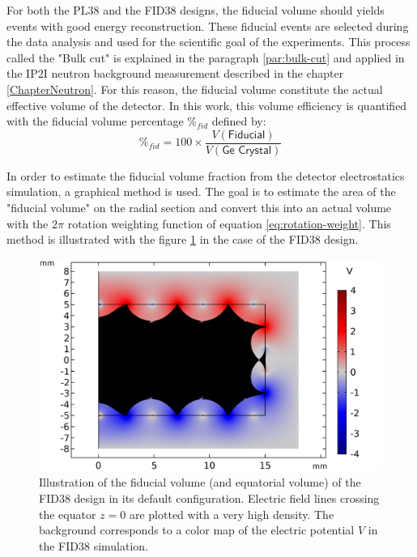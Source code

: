 For both the PL38 and the FID38 designs, the fiducial volume should yields events with good energy reconstruction. These fiducial events are selected during the data analysis and used for the scientific goal of the experiments. This process called the "Bulk cut" is explained in the paragraph \ref{par:bulk-cut} and applied in the IP2I neutron background measurement described in the chapter \ref{ChapterNeutron}. For this reason, the fiducial volume constitute the actual effective volume of the detector. In this work, this volume efficiency is quantified with the fiducial volume percentage $\%_{fid}$ defined by:
\begin{equation}
\%_{fid} = 100 \times \frac{V(\textsf{Fiducial})}{V(\textsf{Ge Crystal})}
\end{equation} 
 
In order to estimate the fiducial volume fraction from the detector electrostatics simulation, a graphical method is used. The goal is to estimate the area of the "fiducial volume" on the radial section and convert this into an actual volume with the $2\pi$ rotation weighting function of equation \ref{eq:rotation-weight}. This method is illustrated with the figure \ref{fig:fid38-fiducial} in the case of the FID38 design. 

\begin{figure}
\centering
\includegraphics[scale=0.5]{Figures/Electrodes/fid38_fiducial_streamlines.png}
\caption{Illustration of the fiducial volume (and equatorial volume) of the FID38 design in its default configuration. Electric field lines crossing the equator $z=0$ are plotted with a very high density. The background corresponds to a color map of the electric potential $V$ in the FID38 simulation.}
\label{fig:fid38-fiducial}
\end{figure}


